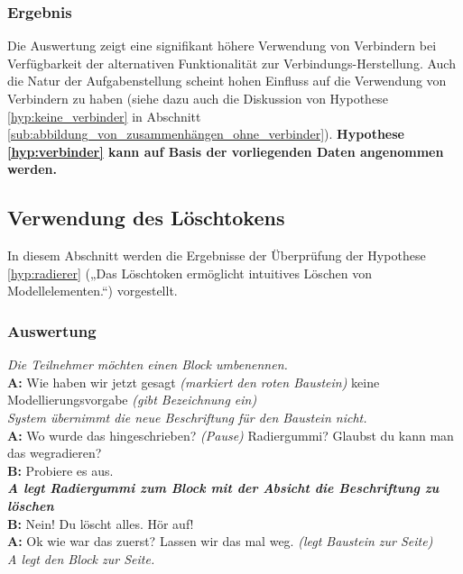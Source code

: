 \subsubsection{Ergebnis} %

Die Auswertung zeigt eine signifikant höhere Verwendung von Verbindern bei Verfügbarkeit der alternativen Funktionalität zur Verbindungs-Herstellung. Auch die Natur der Aufgabenstellung scheint hohen Einfluss auf die Verwendung von Verbindern zu haben (siehe dazu auch die Diskussion von Hypothese \ref{hyp:keine_verbinder} in Abschnitt \ref{sub:abbildung_von_zusammenhängen_ohne_verbinder}). \textbf{Hypothese \ref{hyp:verbinder} kann auf Basis der vorliegenden Daten angenommen werden.}


\subsection{Verwendung des Löschtokens} %
\label{sub:verwendung_des_löschtokens}

In diesem Abschnitt werden die Ergebnisse der Überprüfung der Hypothese \ref{hyp:radierer} („Das Löschtoken ermöglicht intuitives Löschen von Modellelementen.“) vorgestellt.

\subsubsection{Auswertung} %

\begin{transkript}
	\emph{Die Teilnehmer möchten einen Block umbenennen.}\\
	\textbf{A:} Wie haben wir jetzt gesagt \emph{(markiert den roten Baustein)} keine Modellierungsvorgabe \emph{(gibt Bezeichnung ein)}\\
	\emph{System übernimmt die neue Beschriftung für den Baustein nicht.}\\
	\textbf{A:} Wo wurde das hingeschrieben? \emph{(Pause)} Radiergummi? Glaubst du kann man das wegradieren?\\
	\textbf{B:} Probiere es aus.\\
	\textbf{\emph{A legt Radiergummi zum Block mit der Absicht die Beschriftung zu löschen}}\\
	\textbf{B:} Nein! Du löscht alles. Hör auf! \\
	\textbf{A:} Ok wie war das zuerst? Lassen wir das mal weg. \emph{(legt Baustein zur Seite)}\\
	\emph{A legt den Block zur Seite.} 
\end{transkript}

